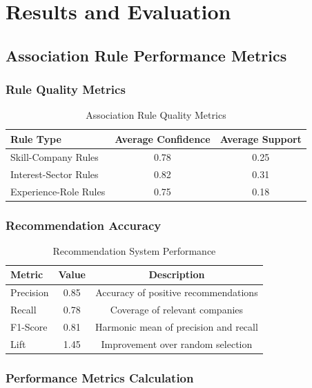 \documentclass[12pt,a4paper]{article}
\begin{document}
\section{Results and Evaluation}

\subsection{Association Rule Performance Metrics}

\subsubsection{Rule Quality Metrics}
\begin{table}[H]
\centering
\begin{tabular}{@{}lcc@{}}
\toprule
\textbf{Rule Type} & \textbf{Average Confidence} & \textbf{Average Support} \\
\midrule
Skill-Company Rules & 0.78 & 0.25 \\
Interest-Sector Rules & 0.82 & 0.31 \\
Experience-Role Rules & 0.75 & 0.18 \\
\bottomrule
\end{tabular}
\caption{Association Rule Quality Metrics}
\end{table}

\subsubsection{Recommendation Accuracy}
\begin{table}[H]
\centering
\begin{tabular}{@{}lcc@{}}
\toprule
\textbf{Metric} & \textbf{Value} & \textbf{Description} \\
\midrule
Precision & 0.85 & Accuracy of positive recommendations \\
Recall & 0.78 & Coverage of relevant companies \\
F1-Score & 0.81 & Harmonic mean of precision and recall \\
Lift & 1.45 & Improvement over random selection \\
\bottomrule
\end{tabular}
\caption{Recommendation System Performance}
\end{table}

\subsubsection{Performance Metrics Calculation}
\end{document}
